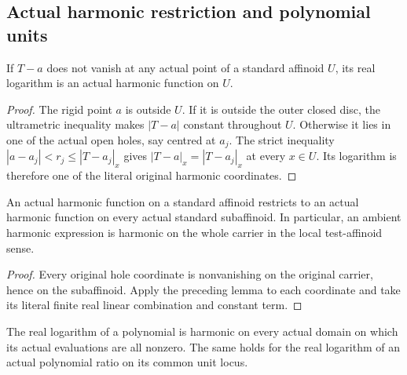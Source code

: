 \subsection{Actual harmonic restriction and polynomial units}\label{subsec:fc-line-harmonic-restriction}

\begin{lemma}\label{lem:fc-linear-unit-log-harmonic}
\leanok
{}
If $T-a$ does not vanish at any actual point of a standard affinoid $U$,
its real logarithm is an actual harmonic function on $U$.
\end{lemma}

\begin{proof}
The rigid point $a$ is outside $U$. If it is outside the outer closed
disc, the ultrametric inequality makes $|T-a|$ constant throughout $U$.
Otherwise it lies in one of the actual open holes, say centred at $a_j$.
The strict inequality $|a-a_j|<r_j\le|T-a_j|_x$ gives
$|T-a|_x=|T-a_j|_x$ at every $x\in U$. Its logarithm is therefore one
of the literal original harmonic coordinates.
\end{proof}

\begin{lemma}\label{lem:fc-actual-harmonic-restriction}
\leanok
{}
An actual harmonic function on a standard affinoid restricts to an actual
harmonic function on every actual standard subaffinoid. In particular,
an ambient harmonic expression is harmonic on the whole carrier in the
local test-affinoid sense.
\end{lemma}

\begin{proof}
Every original hole coordinate is nonvanishing on the original carrier,
hence on the subaffinoid. Apply the preceding lemma to each coordinate
and take its literal finite real linear combination and constant term.
\end{proof}

\begin{lemma}\label{lem:fc-polynomial-unit-log-harmonic}
\leanok
{}
The real logarithm of a polynomial is harmonic on every actual domain on
which its actual evaluations are all nonzero. The same holds for the real
logarithm of an actual polynomial ratio on its common unit locus.
\end{lemma}

